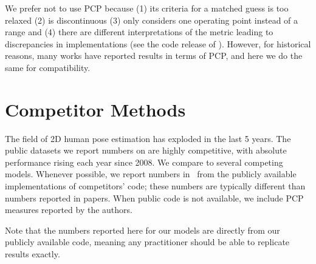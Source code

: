 We prefer not to use PCP because (1) its criteria for a matched guess is too 
relaxed (2) is discontinuous (3) only considers one operating point instead of 
a range and (4) there are different interpretations of the metric leading to 
discrepancies in implementations (see the code release of \citet{eichner-tr}).  
However, for historical reasons, many works have reported results in terms of 
PCP, and here we do the same for compatibility.

\section{Competitor Methods}\label{sec:competition}

The field of 2D human pose estimation has exploded in the last 5 years.  The 
public datasets we report numbers on are highly competitive, with absolute 
performance rising each year since 2008.  We compare to several competing 
models.  Whenever possible, we report numbers in~ from the 
publicly available implementations of competitors' code; these numbers are 
typically different than numbers reported in papers.  When public code is not 
available, we include PCP measures reported by the authors.

Note that the numbers reported here for our models are directly from our 
publicly available code, meaning any practitioner should be able to replicate 
results exactly.

